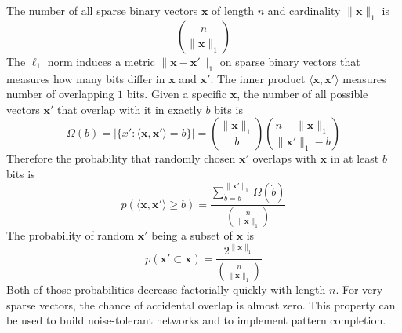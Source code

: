 \documentclass[12pt]{article}
\begin{document}
The number of all sparse binary vectors $\boldsymbol{x}$ of length $n$ and cardinality $\lVert\boldsymbol{x}\rVert_1$ is
\[\binom{n}{\lVert\boldsymbol{x}\rVert_1}\]
The $\ell_1$ norm induces a metric $\lVert\boldsymbol{x}-\boldsymbol{x}'\rVert_1$ on sparse binary vectors that measures how many bits differ in $\boldsymbol{x}$ and $\boldsymbol{x}'$. The inner product $\langle\boldsymbol{x},\boldsymbol{x}'\rangle$ measures number of overlapping $1$ bits. 
Given a specific $\boldsymbol{x}$, the number of all possible vectors $\boldsymbol{x}'$ that overlap with it in exactly $b$ bits is 
\[
\Omega(b)=|\{x':\langle\boldsymbol{x},\boldsymbol{x}'\rangle=b\}|=\binom{\lVert\boldsymbol{x}\rVert_1}{b}\binom{n-\lVert\boldsymbol{x}\rVert_1}{\lVert\boldsymbol{x}'\rVert_1-b}
\]
Therefore the probability that randomly chosen $\boldsymbol{x}'$ overlaps with $\boldsymbol{x}$ in at least $b$ bits is
\[p(\langle\boldsymbol{x},\boldsymbol{x}'\rangle\ge b )=\frac{\sum_{\dot{b}=b}^{\lVert\boldsymbol{x}'\rVert_1}\Omega(\dot{b})}{\binom{n}{\lVert\boldsymbol{x}\rVert_1}}\]
The probability of random $\boldsymbol{x}'$ being a subset of $\boldsymbol{x}$ is
\[p(\boldsymbol{x}'\subset\boldsymbol{x})=\frac{2^{\lVert\boldsymbol{x}\rVert_1}}{\binom{n}{\lVert\boldsymbol{x}\rVert_1}}\]
Both of those probabilities decrease factorially quickly with length $n$. For very sparse vectors, the chance of accidental overlap is almost zero. This property can be used to build noise-tolerant networks and to implement pattern completion.
\end{document}
